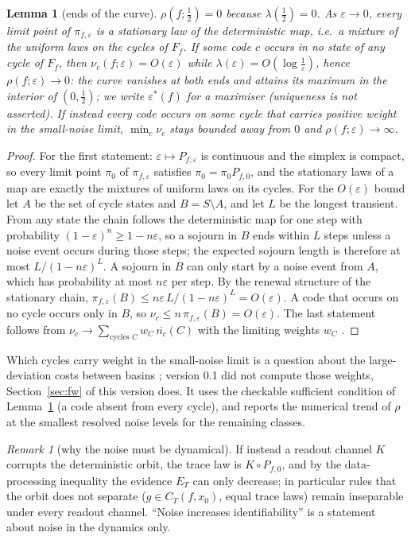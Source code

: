 \documentclass[11pt,a4paper]{article}
\newtheorem{lemma}{Lemma}
\theoremstyle{remark}
\newtheorem{remark}{Remark}
\newcommand{\eps}{\varepsilon}
\begin{document}
\begin{lemma}[ends of the curve]\label{lem:ends}
$\rho(f;\tfrac12)=0$ because $\lambda(\tfrac12)=0$. As $\eps\to0$, every limit point of $\pi_{f,\eps}$ is a stationary law of the deterministic map, i.e.\ a mixture of the uniform laws on the cycles of $F_f$. If some code $c$ occurs in no state of any cycle of $F_f$, then $\nu_c(f;\eps)=O(\eps)$ while $\lambda(\eps)=O(\log\frac1\eps)$, hence $\rho(f;\eps)\to0$: the curve vanishes at both ends and attains its maximum in the interior of $(0,\tfrac12)$; we write $\eps^*(f)$ for a maximiser (uniqueness is not asserted). If instead every code occurs on some cycle that carries positive weight in the small-noise limit, $\min_c\nu_c$ stays bounded away from $0$ and $\rho(f;\eps)\to\infty$.
\end{lemma}
\begin{proof}
For the first statement: $\eps\mapsto P_{f,\eps}$ is continuous and the simplex is compact, so every limit point $\pi_0$ of $\pi_{f,\eps}$ satisfies $\pi_0=\pi_0P_{f,0}$, and the stationary laws of a map are exactly the mixtures of uniform laws on its cycles. For the $O(\eps)$ bound let $A$ be the set of cycle states and $B=S\setminus A$, and let $L$ be the longest transient. From any state the chain follows the deterministic map for one step with probability $(1-\eps)^n\ge1-n\eps$, so a sojourn in $B$ ends within $L$ steps unless a noise event occurs during those steps; the expected sojourn length is therefore at most $L/(1-n\eps)^L$. A sojourn in $B$ can only start by a noise event from $A$, which has probability at most $n\eps$ per step. By the renewal structure of the stationary chain, $\pi_{f,\eps}(B)\le n\eps\,L/(1-n\eps)^L=O(\eps)$. A code that occurs on no cycle occurs only in $B$, so $\nu_c\le n\,\pi_{f,\eps}(B)=O(\eps)$. The last statement follows from $\nu_c\to\sum_{\text{cycles }C}w_C\,\overline{n_c}(C)$ with the limiting weights $w_C$ \citep{FreidlinWentzell}.
\end{proof}

Which cycles carry weight in the small-noise limit is a question about the large-deviation costs between basins \citep{FreidlinWentzell}; version 0.1 did not compute those weights, Section~\ref{sec:fw} of this version does. It uses the checkable sufficient condition of Lemma~\ref{lem:ends} (a code absent from every cycle), and reports the numerical trend of $\rho$ at the smallest resolved noise levels for the remaining classes.

\begin{remark}[why the noise must be dynamical]\label{rem:dyn}
If instead a readout channel $K$ corrupts the deterministic orbit, the trace law is $K\circ P_{f,0}$, and by the data-processing inequality the evidence $E_T$ can only decrease; in particular rules that the orbit does not separate ($g\in C_T(f,x_0)$, equal trace laws) remain inseparable under every readout channel. ``Noise increases identifiability'' is a statement about noise in the dynamics only.
\end{remark}
\end{document}
